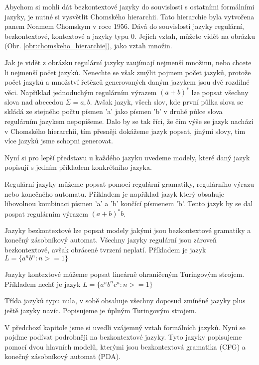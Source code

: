 Abychom si mohli dát bezkontextové jazyky do souvislosti s ostatními formálními jazyky, je nutné si vysvětlit Chomského hierarchii. Tato hierarchie byla vytvořena panem Noamem Chomskym v roce 1956. Dává do souvislosti jazyky regulární, bezkontextové, kontextové a jazyky typu 0. Jejich vztah, můžete vidět na obrázku (Obr. \ref{obr:chomskeho_hierarchie}), jako vztah množin.


Jak je vidět z obrázku regulární jazyky zaujímají nejmenší množinu, nebo chcete li nejmenší počet jazyků. Nenechte se však zmýlit pojmem  počet jazyků, protože počet jazyků a množství řetězců generovaných daným jazykem jsou dvě rozdílné věci. Například jednoduchým regulárním výrazem \( (a + b)^* \) lze popsat všechny slova nad abecedou \( \Sigma = {a, b} \). Avšak jazyk, všech slov, kde první půlka slova se skládá ze stejného počtu písmen 'a' jako písmen 'b' v druhé půlce slova regulárním jazykem nepopíšeme. Dalo by se tak říci, že čím výše se jazyk nachází v Chomského hierarchii, tím přesněji dokážeme jazyk popsat, jinými slovy, tím více jazyků jsme schopni generovat.

Nyní si pro lepší představu u každého jazyku uvedeme modely, které daný jazyk popisují s jedním příkladem konkrétního jazyka.

Regulární jazyky můžeme popsat pomocí regulární gramatiky, regulárního výrazu nebo konečného automatu. Příkladem je například jazyk který obsahuje libovolnou kombinaci písmen 'a' a 'b' končící písmenem 'b'. Tento jazyk by se dal pospat regulárním výrazem \( (a + b)^* b \). 

Jazyky bezkontextové lze popsat modely jakými jsou bezkontextové gramatiky a konečný zásobníkový automat. Všechny jazyky regulární jsou zároveň bezkontextové, avšak obrácené tvrzení neplatí. Příkladem je jazyk \( L = \{ a^n b^n : n >= 1 \}  \)

Jazyky kontextové můžeme popsat lineárně ohraničeným Turingovým strojem. Příkladem nechť je jazyk \( L = \{ a^n b^n c^n : n >= 1 \}  \)

Třída jazyků typu nula, v sobě obsahuje všechny doposud zmíněné jazyky plus ještě jazyky navíc. Popisujeme je úplným Turingovým strojem. 
\cite{Chomsky_hierarchy}

V předchozí kapitole jsme si uvedli vzájemný vztah formálních jazyků. Nyní se pojďme podívat podrobněji na bezkontextové jazyky. Tyto jazyky popisujeme pomocí dvou hlavních modelů, kterými jsou bezkontextová gramatika (CFG) a konečný zásobníkový automat (PDA).

